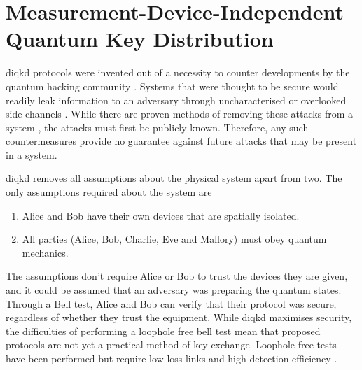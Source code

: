 

\section{Measurement-Device-Independent Quantum Key Distribution}
\label{sec:mdi-qkd}

\Ac{diqkd} protocols were invented out of a necessity to counter developments by the quantum hacking community \cite{Mayers1998}. Systems that were thought to be secure would readily leak information to an adversary through uncharacterised or overlooked side-channels \cite{Lo2014}. While there are proven methods of removing these attacks from a system \cite{Lucamarini2015Practical}, the attacks must first be publicly known. Therefore, any such countermeasures provide no guarantee against future attacks that may be present in a system. 

\Ac{diqkd} removes all assumptions about the physical system apart from two. The only assumptions required about the system are

\begin{enumerate}
	\item Alice and Bob have their own devices that are spatially isolated.
	\item All parties (Alice, Bob, Charlie, Eve and Mallory) must obey quantum mechanics.
\end{enumerate}

The assumptions don't require Alice or Bob to trust the devices they are given, and it could be assumed that an adversary was preparing the quantum states. Through a Bell test, Alice and Bob can verify that their protocol was secure, regardless of whether they trust the equipment. While \ac{diqkd} maximises security, the difficulties of performing a loophole free bell test mean that proposed protocols are not yet a practical method of key exchange. Loophole-free tests have been performed but require low-loss links and high detection efficiency \cite{hensen2015, shalm2015, Giustina2015}. 

